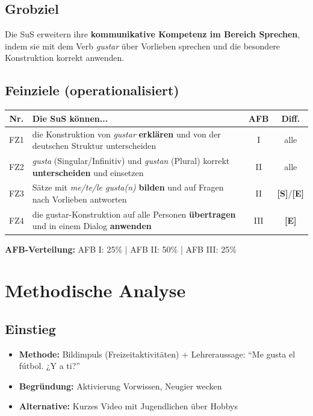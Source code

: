 \documentclass[11pt,a4paper]{article}
\newcommand{\Std}{\textcolor{standard}{\textbf{[S]}}}
\newcommand{\E}{\textcolor{erweiterung}{\textbf{[E]}}}
\begin{document}
\subsection{Grobziel}
Die SuS erweitern ihre \textbf{kommunikative Kompetenz im Bereich Sprechen}, indem sie mit dem Verb \textit{gustar} über Vorlieben sprechen und die besondere Konstruktion korrekt anwenden.

\subsection{Feinziele (operationalisiert)}
\begin{tabular}{|c|p{7.5cm}|c|c|}
\hline
\textbf{Nr.} & \textbf{Die SuS können...} & \textbf{AFB} & \textbf{Diff.} \\
\hline
FZ1 & die Konstruktion von \textit{gustar} \textbf{erklären} und von der deutschen Struktur unterscheiden & I & alle \\
\hline
FZ2 & \textit{gusta} (Singular/Infinitiv) und \textit{gustan} (Plural) korrekt \textbf{unterscheiden} und einsetzen & II & alle \\
\hline
FZ3 & Sätze mit \textit{me/te/le gusta(n)} \textbf{bilden} und auf Fragen nach Vorlieben antworten & II & \Std{}/\E{} \\
\hline
FZ4 & die gustar-Konstruktion auf alle Personen \textbf{übertragen} und in einem Dialog \textbf{anwenden} & III & \E{} \\
\hline
\end{tabular}

\vspace{1em}
\textbf{AFB-Verteilung:} AFB I: 25\% | AFB II: 50\% | AFB III: 25\%

\section{Methodische Analyse}

\subsection{Einstieg}
\begin{itemize}
    \item \textbf{Methode:} Bildimpuls (Freizeitaktivitäten) + Lehreraussage: ``Me gusta el fútbol. ¿Y a ti?''
    \item \textbf{Begründung:} Aktivierung Vorwissen, Neugier wecken
    \item \textbf{Alternative:} Kurzes Video mit Jugendlichen über Hobbys
\end{itemize}
\end{document}
